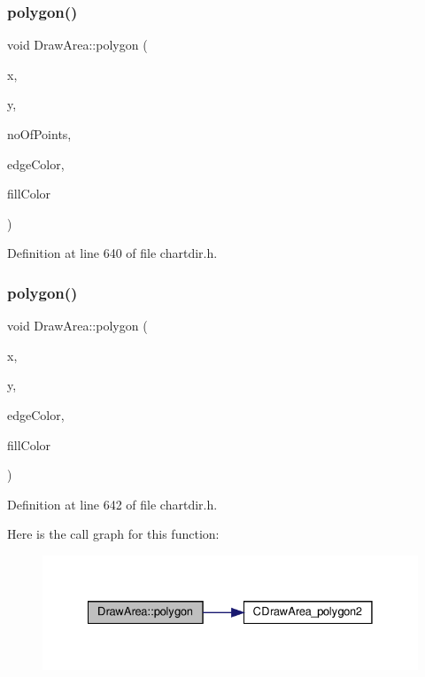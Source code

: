 \subsubsection{\texorpdfstring{polygon()}{polygon()}\hspace{0.1cm}{\footnotesize\ttfamily [1/3]}}
{\footnotesize\ttfamily void Draw\+Area\+::polygon (\begin{DoxyParamCaption}\item[{const int $\ast$}]{x,  }\item[{const int $\ast$}]{y,  }\item[{int}]{no\+Of\+Points,  }\item[{int}]{edge\+Color,  }\item[{int}]{fill\+Color }\end{DoxyParamCaption})\hspace{0.3cm}{\ttfamily [inline]}}



Definition at line 640 of file chartdir.\+h.

\mbox{\label{class_draw_area_a2350520369e54d4dfe141d1f3eba099b}} 
\subsubsection{\texorpdfstring{polygon()}{polygon()}\hspace{0.1cm}{\footnotesize\ttfamily [2/3]}}
{\footnotesize\ttfamily void Draw\+Area\+::polygon (\begin{DoxyParamCaption}\item[{\hyperlink{class_int_array}{Int\+Array}}]{x,  }\item[{\hyperlink{class_int_array}{Int\+Array}}]{y,  }\item[{int}]{edge\+Color,  }\item[{int}]{fill\+Color }\end{DoxyParamCaption})\hspace{0.3cm}{\ttfamily [inline]}}



Definition at line 642 of file chartdir.\+h.

Here is the call graph for this function\+:
\nopagebreak
\begin{figure}[H]
\begin{center}
\leavevmode
\includegraphics[width=328pt]{class_draw_area_a2350520369e54d4dfe141d1f3eba099b_cgraph}
\end{center}
\end{figure}
\mbox{\label{class_draw_area_ac562a79e307037789a5cabaebde77256}} 
